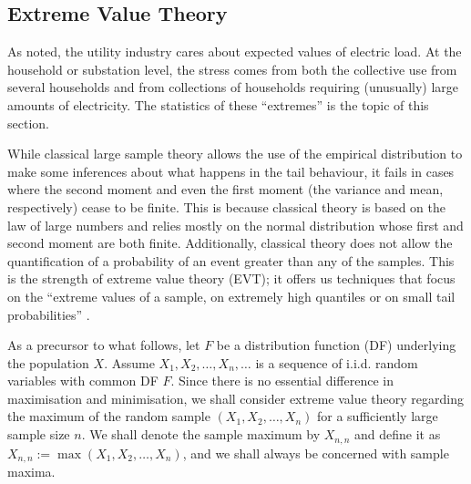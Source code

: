 \documentclass[a4paper]{article}
\begin{document}

\subsection{Extreme Value Theory}
\label{subsec:EVT}
As \cite{hong16} noted, the utility industry cares about expected values of electric load. At the household or substation level, the stress comes from both the collective use from several households and from collections of households requiring (unusually) large amounts of electricity. The statistics of these ``extremes'' is the topic of this section.

While classical large sample theory allows the use of the empirical distribution to make some inferences about what happens in the tail behaviour, it fails in cases where the second moment and even the first moment (the variance and mean, respectively) cease to be finite. This is because classical theory is based on the law of large numbers and relies mostly on the normal distribution whose first and second moment are both finite. Additionally, classical theory does not allow the quantification of a probability of an event greater than any of the samples. This is the strength of extreme value theory (EVT); it offers us techniques that focus on the ``extreme values of a sample, on extremely high quantiles or on small tail probabilities'' \cite[ch.~1]{beirlant}.

As a precursor to what follows, let $F$ be a distribution function (DF) underlying the population $X$. Assume $X_1,X_2, \ldots, X_n, \ldots$ is a sequence of i.i.d. random variables with common DF $F$. Since there is no essential difference in maximisation and minimisation, we shall consider extreme value theory regarding the maximum of the random sample $(X_1,X_2, \ldots, X_n)$ for a sufficiently large sample size $n$. We shall denote the sample maximum by $X_{n,n}$ and define it as $X_{n,n}:= \max(X_1,X_2, \ldots, X_n)$, and we shall always be concerned with sample maxima.
\end{document}
